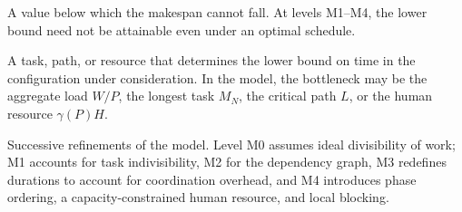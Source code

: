 \begin{description}[style=nextline]
  \item[Lower Bound on Time] A value below which the makespan cannot fall. At
  levels M1--M4, the lower bound need not be attainable even under an optimal
  schedule.

  \item[Bottleneck] A task, path, or resource that determines the lower bound on
  time in the configuration under consideration. In the model, the bottleneck
  may be the aggregate load $W/P$, the longest task $M_N$, the critical path
  $L$, or the human resource $\gamma(P)H$.

  \item[Levels M0--M4] Successive refinements of the model. Level M0 assumes
  ideal divisibility of work; M1 accounts for task indivisibility, M2 for the
  dependency graph, M3 redefines durations to account for coordination
  overhead, and M4 introduces phase ordering, a capacity-constrained human
  resource, and local blocking.
\end{description}
